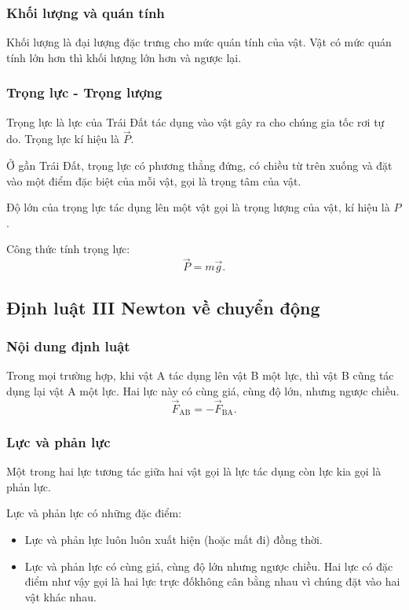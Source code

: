 \subsubsection{Khối lượng và quán tính}
Khối lượng là đại lượng đặc trưng cho mức quán tính của vật. Vật có mức quán tính lớn hơn thì khối lượng lớn hơn và ngược lại. 

\subsubsection{Trọng lực - Trọng lượng}

Trọng lực là lực của Trái Đất tác dụng vào vật gây ra cho chúng gia tốc rơi tự do. Trọng lực kí hiệu là $\vec P.$

Ở gần Trái Đất, trọng lực có phương thẳng đứng, có chiều từ trên xuống và đặt vào một điểm đặc biệt của mỗi vật, gọi là trọng tâm của vật.

Độ lớn của trọng lực tác dụng lên một vật gọi là trọng lượng của vật, kí hiệu là $P$. 

Công thức tính trọng lực: 
\begin{equation*}
	\vec P=m\vec g.
\end{equation*}
\subsection{Định luật III Newton về chuyển động}
\subsubsection{Nội dung định luật}
Trong mọi trường hợp, khi vật A tác dụng lên vật B một lực, thì vật B cũng tác dụng lại vật A một lực. Hai lực này có cùng giá, cùng độ lớn, nhưng ngược chiều.
\begin{equation*}
	{\vec F}_{\text{AB}}=-{\vec F}_{\text{BA}}.
\end{equation*}
\subsubsection{Lực và phản lực}
Một trong hai lực tương tác giữa hai vật gọi là lực tác dụng còn lực kia gọi là phản lực.

Lực và phản lực có những đặc điểm: 
\begin{itemize}
	\item Lực và phản lực luôn luôn xuất hiện (hoặc mất đi) đồng thời.
	\item Lực và phản lực có cùng giá, cùng độ lớn nhưng ngược chiều. Hai lực có đặc điểm như vậy gọi là hai lực trực đốkhông cân bằng nhau vì chúng đặt vào hai vật khác nhau.
\end{itemize}
